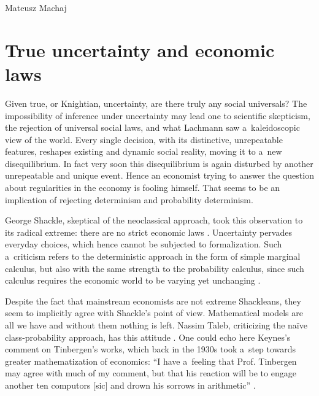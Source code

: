 \begin{artengenv}{Mateusz Machaj}
\section{True uncertainty and economic laws}

Given true, or Knightian, uncertainty, are there truly any social universals? The impossibility of inference under uncertainty may lead one to scientific skepticism, the rejection of universal social laws, and what Lachmann 
\parencite*[][]{lachmann_mises_1976} %
 saw a~kaleidoscopic view of the world. Every single decision, with its distinctive, unrepeatable features, reshapes existing and dynamic social reality, moving it to a~new disequilibrium. In fact very soon this disequilibrium is again disturbed by another unrepeatable and unique event. Hence an economist trying to answer the question about regularities in the economy is fooling himself. That seems to be an implication of rejecting determinism and probability determinism.



George Shackle, skeptical of the neoclassical approach, took this observation to its radical extreme: there are no strict economic laws 
\parencite[][p.427]{shackle_epistemics_1972}. %
 Uncertainty pervades everyday choices, which hence cannot be subjected to formalization. Such a~criticism refers to the deterministic approach in the form of simple marginal calculus, but also with the same strength to the probability calculus, since such calculus requires the economic world to be varying yet unchanging 
\parencite[][p.381]{shackle_epistemics_1972}.%




Despite the fact that mainstream economists are not extreme Shackleans, they seem to implicitly agree with Shackle's point of view. Mathematical models are all we have and without them nothing is left. Nassim Taleb, criticizing the naïve class-probability approach, has this attitude 
\parencite[][p.276]{taleb_black_2007}. %
 One could echo here Keynes's comment on Tinbergen's works, which back in the 1930s took a~step towards greater mathematization of economics: ``I have a~feeling that Prof. Tinbergen may agree with much of my comment, but that his reaction will be to engage another ten computors [sic] and drown his sorrows in arithmetic'' 
\parencite[][p.568]{keynes_professor_1939}.%





\end{artengenv}
